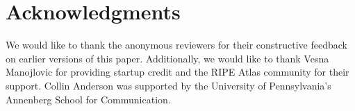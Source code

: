 \section*{Acknowledgments}

We would like to thank the anonymous reviewers for their constructive feedback on earlier versions of this paper. Additionally, we would like to thank Vesna Manojlovic for providing startup credit and the RIPE Atlas community for their support. Collin Anderson was supported by the University of Pennsylvania's Annenberg School for Communication.